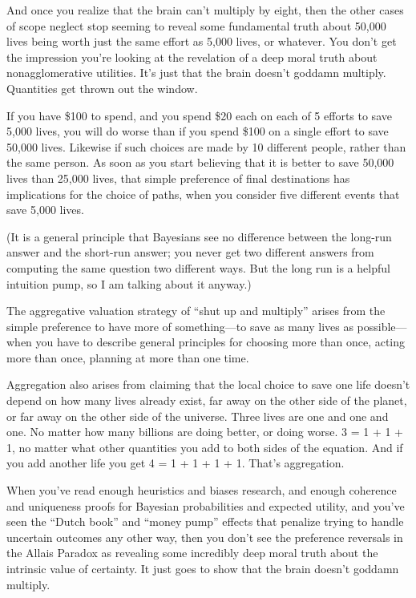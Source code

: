 {
 And once you realize that the brain can't multiply
by eight, then the other cases of scope neglect stop seeming to reveal
some fundamental truth about 50,000 lives being worth just the same
effort as 5,000 lives, or whatever. You don't get the
impression you're looking at the revelation of a deep
moral truth about nonagglomerative utilities. It's just
that the brain doesn't goddamn multiply. Quantities get
thrown out the window.}

{
 If you have \$100 to spend, and you spend \$20 each on each of 5
efforts to save 5,000 lives, you will do worse than if you spend \$100
on a single effort to save 50,000 lives. Likewise if such choices are
made by 10 different people, rather than the same person. As soon as
you start believing that it is better to save 50,000 lives than 25,000
lives, that simple preference of final destinations has implications
for the choice of paths, when you consider five different events that
save 5,000 lives.}

{
 (It is a general principle that Bayesians see no difference
between the long-run answer and the short-run answer; you never get two
different answers from computing the same question two different ways.
But the long run is a helpful intuition pump, so I am talking about it
anyway.)}

{
 The aggregative valuation strategy of ``shut up
and multiply'' arises from the simple preference to
have more of something---to save as many lives as possible---when you
have to describe general principles for choosing more than once, acting
more than once, planning at more than one time.}

{
 Aggregation also arises from claiming that the local choice to
save one life doesn't depend on how many lives already
exist, far away on the other side of the planet, or far away on the
other side of the universe. Three lives are one and one and one. No
matter how many billions are doing better, or doing worse. 3 = 1 + 1 +
1, no matter what other quantities you add to both sides of the
equation. And if you add another life you get 4 = 1 + 1 + 1 + 1.
That's aggregation.}

{
 When you've read enough heuristics and biases
research, and enough coherence and uniqueness proofs for Bayesian
probabilities and expected utility, and you've seen the
``Dutch book'' and
``money pump'' effects that penalize
trying to handle uncertain outcomes any other way, then you
don't see the preference reversals in the Allais
Paradox as revealing some incredibly deep moral truth about the
intrinsic value of certainty. It just goes to show that the brain
doesn't goddamn multiply.}

